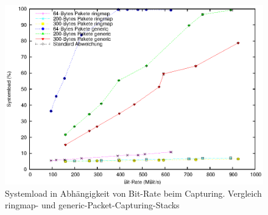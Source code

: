 \begin{figure} 
\centering \includegraphics[width=5.5in]{plots/graphs/sysload_generic_vs_ringmap_mbs.eps}
\caption{Systemload in Abhängigkeit von Bit-Rate beim Capturing. Vergleich ringmap- und generic-Packet-Capturing-Stacks}
\label{img:plot_sysload_ringmap_vs_generic}
\end{figure}
